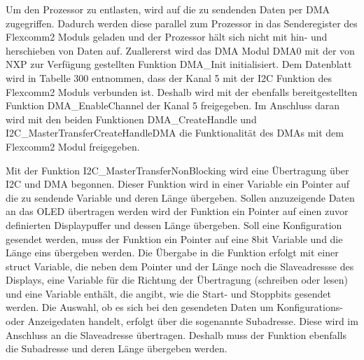 Um den Prozessor zu entlasten, wird auf die zu sendenden Daten per \ac{DMA} zugegriffen. Dadurch werden diese parallel zum Prozessor in das Senderegister des Flexcomm2 Moduls geladen und der Prozessor hält sich nicht mit hin- und herschieben von Daten auf. Zuallererst wird das \ac{DMA} Modul DMA0 mit der von NXP zur Verfügung gestellten Funktion \glqq DMA\_Init\grqq{} initialisiert. Dem Datenblatt wird in Tabelle 300 entnommen, dass der Kanal 5 mit der \ac{I2C} Funktion des Flexcomm2 Moduls verbunden ist. Deshalb wird mit der ebenfalls bereitgestellten Funktion \glqq DMA\_EnableChannel \grqq{} der Kanal 5 freigegeben. Im Anschluss daran wird mit den beiden Funktionen \glqq DMA\_CreateHandle\grqq{} und \glqq I2C\_MasterTransferCreateHandleDMA\grqq{} die Funktionalität des \ac{DMA}s mit dem Flexcomm2 Modul freigegeben.\vspace{11pt}

Mit der Funktion \glqq I2C\_MasterTransferNonBlocking\grqq{} wird eine Übertragung über \ac{I2C} und \ac{DMA} begonnen. Dieser Funktion wird in einer Variable ein Pointer auf die zu sendende Variable und deren Länge übergeben. Sollen anzuzeigende Daten an das \ac{OLED} übertragen werden wird der Funktion ein Pointer auf einen zuvor definierten Displaypuffer und dessen Länge übergeben. Soll eine Konfiguration gesendet werden, muss der Funktion ein Pointer auf eine 8bit Variable und die Länge eins übergeben werden. Die Übergabe in die Funktion erfolgt mit einer \glqq struct\grqq{} Variable, die neben dem Pointer und der Länge noch die Slaveadressse des Displays, eine Variable für die Richtung der Übertragung (schreiben oder lesen) und eine Variable enthält, die angibt, wie die Start- und Stoppbits gesendet werden. Die Auswahl, ob es sich bei den gesendeten Daten um Konfigurations- oder Anzeigedaten handelt, erfolgt über die sogenannte Subadresse. Diese wird im Anschluss an die Slaveadresse übertragen. Deshalb muss der Funktion ebenfalls die Subadresse und deren Länge übergeben werden.

